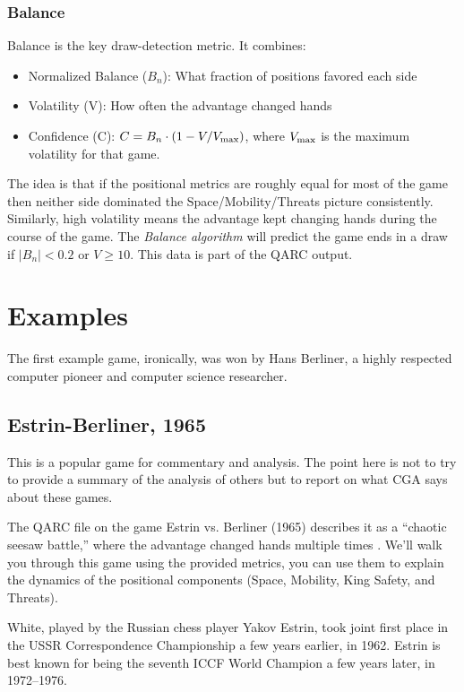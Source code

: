 \documentclass[12pt]{book}
\begin{document}
\subsection{Balance}

Balance is the key draw-detection metric. It combines:

\begin{itemize}
\item
Normalized Balance ($B_n$): What fraction of positions favored each side
\item
Volatility (V): How often the advantage changed hands
\item
Confidence (C): $C=B_n\cdot (1 - V/V_{\rm max})$, where $V_{\rm max}$ is
the maximum volatility for that game.
\end{itemize}

The idea is that
if the positional metrics are roughly equal for most of the game
then neither side dominated the Space/Mobility/Threats picture consistently.
Similarly, high volatility means the advantage kept changing hands
during the course of the game. The {\it Balance algorithm} will predict
the game ends in a draw if $|B_n|<0.2$ or $V \geq 10$.
This data is part of the QARC output.

\chapter{Examples}

The first example game, ironically, was won by
Hans Berliner, a highly respected computer pioneer and computer science
researcher.

\section{Estrin-Berliner, 1965}
\label{sec:estrin-berliner_1965}
        
This is a popular game for commentary and analysis.
The point here is not to try to provide a summary of the
analysis of others but to report on what CGA says about
these games.

The QARC file on the game Estrin vs. Berliner (1965) describes
it as a ``chaotic seesaw battle,''
where the advantage changed hands multiple times \cite{Be65}.
 We'll walk you through this game using the provided metrics, you can use them
to explain the dynamics of the positional components (Space, Mobility, King Safety, and Threats).

White, played by the Russian chess player Yakov Estrin, took joint first place in the
USSR Correspondence Championship
a few years earlier, in 1962.
Estrin is best known for being the seventh ICCF World Champion a few
years later, in 1972–1976.
\end{document}
